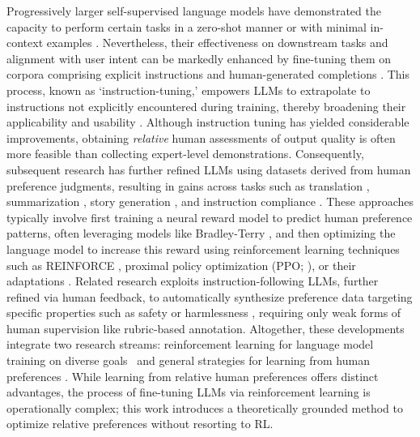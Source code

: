 Progressively larger self-supervised language models have demonstrated the capacity to perform certain tasks in a zero-shot manner \citep{radford2019language} or with minimal in-context examples \citep{gpt3,megatron,chowdhery2022palm}. Nevertheless, their effectiveness on downstream tasks and alignment with user intent can be markedly enhanced by fine-tuning them on corpora comprising explicit instructions and human-generated completions \citep{mishra-etal-2022-cross,sanh2022multitask,chung2022scaling,thoppilan2022lamda}. This process, known as `instruction-tuning,' empowers LLMs to extrapolate to instructions not explicitly encountered during training, thereby broadening their applicability and usability \citep{chung2022scaling}. Although instruction tuning has yielded considerable improvements, obtaining \textit{relative} human assessments of output quality is often more feasible than collecting expert-level demonstrations. Consequently, subsequent research has further refined LLMs using datasets derived from human preference judgments, resulting in gains across tasks such as translation \citep{kreutzer-etal-2018-reliability}, summarization \citep{stiennon2022learning,ziegler2020finetuning}, story generation \citep{ziegler2020finetuning}, and instruction compliance \citep{ouyang2022training,ramamurthy2023is}. These approaches typically involve first training a neural reward model to predict human preference patterns, often leveraging models like Bradley-Terry \citep{bradley1952rankanalysis}, and then optimizing the language model to increase this reward using reinforcement learning techniques such as REINFORCE \citep{williams1992reinforce}, proximal policy optimization (PPO; \cite{schulman2017proximal}), or their adaptations \citep{ramamurthy2023is}. Related research exploits instruction-following LLMs, further refined via human feedback, to automatically synthesize preference data targeting specific properties such as safety or harmlessness \citep{bai2022constitutional}, requiring only weak forms of human supervision like rubric-based annotation. Altogether, these developments integrate two research streams: reinforcement learning for language model training on diverse goals~\citep{Ranzato2015SequenceLT,paulus2018a,wu2018learning} and general strategies for learning from human preferences \citep{christiano2017deep,kupcsik2018learning}. While learning from relative human preferences offers distinct advantages, the process of fine-tuning LLMs via reinforcement learning is operationally complex; this work introduces a theoretically grounded method to optimize relative preferences without resorting to RL.

